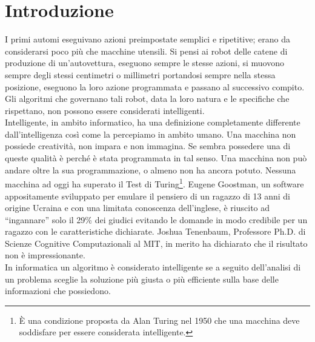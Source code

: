 \chapter*{Introduzione}
\fancyfoot[C]{\thepage } 
I primi automi eseguivano azioni preimpostate semplici e ripetitive; erano da considerarsi poco 
più che macchine utensili. Si pensi ai robot delle catene di produzione di un'autovettura, 
eseguono sempre le stesse azioni, si muovono sempre degli stessi centimetri o millimetri 
portandosi sempre nella stessa posizione, eseguono la loro azione programmata 
e passano al successivo compito. Gli algoritmi che governano tali robot, data la 
loro natura e le specifiche che rispettano, non possono essere considerati intelligenti.\\
Intelligente, in ambito informatico, ha una definizione completamente differente 
dall'intelligenza così come la percepiamo in ambito umano. Una macchina non 
possiede creatività, non impara e non immagina. Se sembra possedere una di queste 
qualità è perché è stata programmata in tal senso. Una macchina non può andare oltre 
la sua programmazione, o almeno non ha ancora potuto. Nessuna macchina ad oggi ha superato 
il Test di Turing\footnote{È una condizione proposta da Alan Turing nel 1950 
che una macchina deve soddisfare per essere considerata intelligente.}. Eugene 
Goostman, un software appositamente sviluppato per emulare il pensiero 
di un ragazzo di 13 anni di origine Ucraina e con una limitata conoscenza dell'inglese,
è riuscito ad ``ingannare'' solo il 29\% dei giudici evitando le domande in modo 
credibile per un ragazzo con le caratteristiche dichiarate. Joshua Tenenbaum,
Professore Ph.D. di Scienze Cognitive Computazionali al MIT, in merito ha dichiarato che 
il risultato non è impressionante.\cite{eugene}\\
In informatica un algoritmo è considerato intelligente
se a seguito dell'analisi di un problema sceglie la soluzione più giusta o più efficiente 
sulla base delle informazioni che possiedono.

